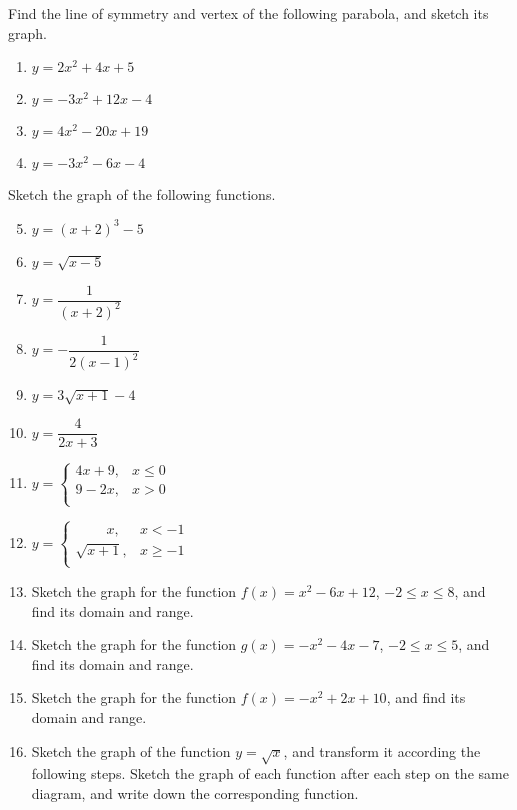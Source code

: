 \documentclass[12pt]{report}
\begin{document}
\begin{multicols}{2}

  Find the line of symmetry and vertex of the following parabola, and sketch its
  graph.
  \begin{enumerate}
    \item $y = 2x^2 + 4x + 5$
    \item $y = -3x^2 + 12x - 4$
    \item $y = 4x^2 - 20x + 19$
    \item $y = -3x^2 - 6x - 4$
  \end{enumerate}

  Sketch the graph of the following functions.
  \begin{enumerate}
    \setcounter{enumi}{4}
    \item $y = (x+2)^3 - 5$
    \item $y = \sqrt{x-5}$
    \item $y = \dfrac{1}{(x+2)^2}$
    \item $y = -\dfrac{1}{2(x-1)^2}$
    \item $y = 3\sqrt{x+1} - 4$
    \item $y = \dfrac{4}{2x+3}$
    \item $y = \left\{\begin{array}{ll}
              4x+9,   & x \leq 0 \\
              9 - 2x, & x > 0    \\
            \end{array}\right.$
    \item $y = \left\{\begin{array}{ll}
              \ \ \ \ \ \ \ \ \ \ x, & x < -1    \\
              \sqrt{x+1},            & x \geq -1 \\
            \end{array}\right.$
  \end{enumerate}

  \begin{enumerate}
    \setcounter{enumi}{12}
    \item Sketch the graph for the function $f(x) = x^2 - 6x + 12$, $-2 \leq x \leq 8$,
          and find its domain and range.
    \item Sketch the graph for the function $g(x) = -x^2 - 4x - 7$, $-2 \leq x \leq 5$,
          and find its domain and range.
    \item Sketch the graph for the function $f(x) = -x^2 + 2x + 10$, and find its domain
          and range.
    \item Sketch the graph of the function $y = \sqrt{x}$, and transform it according the
          following steps. Sketch the graph of each function after each step on the same
          diagram, and write down the corresponding function.


\end{enumerate}
\end{multicols}
\end{document}
